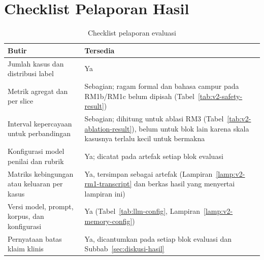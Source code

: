 \section{Checklist Pelaporan Hasil}
\label{lamp:v2-report-checklist}

\begin{table}[!htbp]
\centering
\caption{Checklist pelaporan evaluasi}
{\footnotesize
\begin{tabularx}{\textwidth}{|>{\raggedright\arraybackslash}X|>{\centering\arraybackslash}p{2.2cm}|}
\hline
\rowcolor{tableheadgray}
\textbf{Butir} & \textbf{Tersedia} \\
\hline
Jumlah kasus dan distribusi label & Ya \\
\hline
Metrik agregat dan per slice & Sebagian; ragam formal dan bahasa campur pada RM1b/RM1c belum dipisah (Tabel~\ref{tab:v2-safety-result}) \\
\hline
Interval kepercayaan untuk perbandingan & Sebagian; dihitung untuk ablasi RM3 (Tabel~\ref{tab:v2-ablation-result}), belum untuk blok lain karena skala kasusnya terlalu kecil untuk bermakna \\
\hline
Konfigurasi model penilai dan rubrik & Ya; dicatat pada artefak setiap blok evaluasi \\
\hline
Matriks kebingungan atau keluaran per kasus & Ya, tersimpan sebagai artefak (Lampiran~\ref{lamp:v2-rm1-transcript} dan berkas hasil yang menyertai lampiran ini) \\
\hline
Versi model, prompt, korpus, dan konfigurasi & Ya (Tabel~\ref{tab:llm-config}, Lampiran~\ref{lamp:v2-memory-config}) \\
\hline
Pernyataan batas klaim klinis & Ya, dicantumkan pada setiap blok evaluasi dan Subbab~\ref{sec:diskusi-hasil} \\
\hline
\end{tabularx}
}
\end{table}


